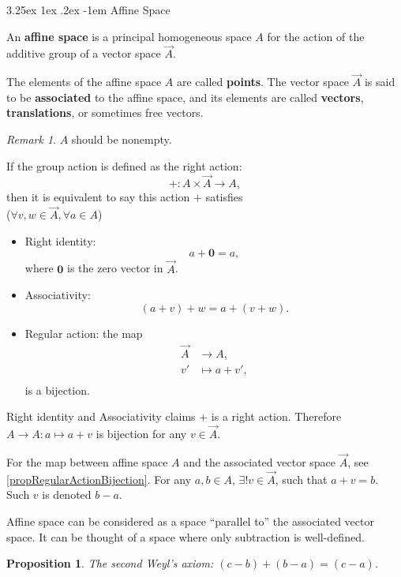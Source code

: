 \documentclass[12pt, letterpaper]{article}
\makeatletter
\newtheorem{prop}{Proposition}[section]
\renewcommand\paragraph{\@startsection{paragraph}{4}{\z@}%
	{3.25ex \@plus1ex \@minus.2ex}%
	{-1em}%
	{\normalfont\normalsize\bfseries}}
\theoremstyle{definition}
\theoremstyle{remark}
\newtheorem*{rem*}{Remark}
\theoremstyle{definition}
\theoremstyle{plain}
\numberwithin{equation}{section}
\makeatother
\begin{document}
	\paragraph{Affine Space}
	\begin{def*}
		An \textbf{affine space} is a principal homogeneous space $A$
		for the action of the additive group of a vector space $\overrightarrow{A}$.
		
		The elements of the affine space $A$ are called \textbf{points}.
		The vector space $\overrightarrow{A}$ is said to be \textbf{associated} to the affine space,
		and its elements are called \textbf{vectors}, \textbf{translations}, or sometimes free vectors.
	\end{def*}
	\begin{rem*}
		$A$ should be nonempty.
		
		If the group action is defined as the right action:
		\[ +\colon A\times \overrightarrow{A}\to A, \]
		then it is equivalent to say this action $+$ satisfies\\
		($\forall v,w\in \overrightarrow{A},\forall a\in A$)
		\begin{itemize}
			\item Right identity:
			\[ a+\mathbf{0}=a, \]
			where $\mathbf{0}$ is the zero vector in $\overrightarrow{A}$.
			\item Associativity:
			\[ (a+v)+w=a+(v+w) . \]
			\item Regular action: the map 
			\[ \begin{aligned}
				\overrightarrow{A} &\to A,\\
				v' &\mapsto a+v',\\
			\end{aligned} \]
			is a bijection.
		\end{itemize}
		Right identity and Associativity claims $+$ is a right action.
		Therefore $A\to A\colon a\mapsto a+v$ is bijection for any $v\in \overrightarrow{A}$.
		
		For the map between affine space $A$ and the associated vector space $\overrightarrow{A}$,
		see \ref{propRegularActionBijection}.
		For any $a,b\in A$, $\exists! v\in \overrightarrow{A}$, such that $a+v=b$.
		Such $v$ is denoted $b-a$.
		
		Affine space can be considered as a space ``parallel to'' the associated vector space.
		It can be thought of a space where only subtraction is well-defined.
	\end{rem*}
	\begin{prop}
		The second Weyl's axiom: $(c-b)+(b-a)=(c-a)$.
	\end{prop}
	
\end{document}
